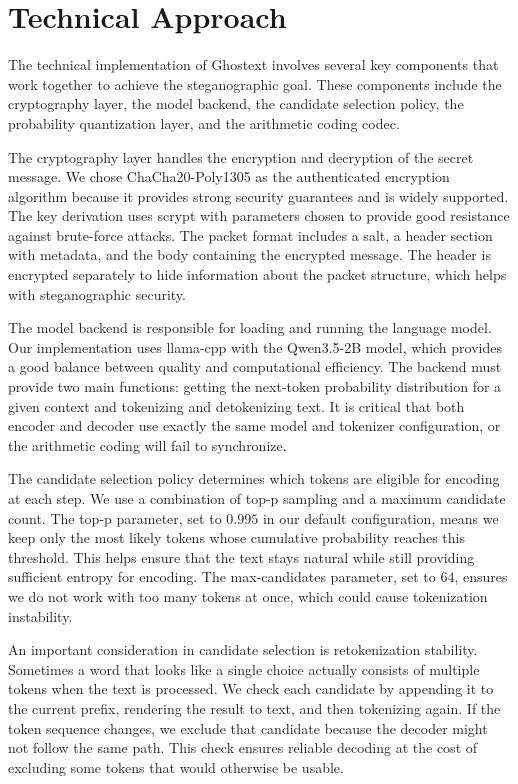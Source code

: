 \documentclass[sigconf,review,anonymous]{acmart}
\begin{document}
{\section{Technical Approach}

The technical implementation of Ghostext involves several key components that work together to achieve the steganographic goal. These components include the cryptography layer, the model backend, the candidate selection policy, the probability quantization layer, and the arithmetic coding codec.

The cryptography layer handles the encryption and decryption of the secret message. We chose ChaCha20-Poly1305 as the authenticated encryption algorithm because it provides strong security guarantees and is widely supported. The key derivation uses scrypt with parameters chosen to provide good resistance against brute-force attacks. The packet format includes a salt, a header section with metadata, and the body containing the encrypted message. The header is encrypted separately to hide information about the packet structure, which helps with steganographic security.

The model backend is responsible for loading and running the language model. Our implementation uses llama-cpp with the Qwen3.5-2B model, which provides a good balance between quality and computational efficiency. The backend must provide two main functions: getting the next-token probability distribution for a given context and tokenizing and detokenizing text. It is critical that both encoder and decoder use exactly the same model and tokenizer configuration, or the arithmetic coding will fail to synchronize.

The candidate selection policy determines which tokens are eligible for encoding at each step. We use a combination of top-p sampling and a maximum candidate count. The top-p parameter, set to $0.995$ in our default configuration, means we keep only the most likely tokens whose cumulative probability reaches this threshold. This helps ensure that the text stays natural while still providing sufficient entropy for encoding. The max-candidates parameter, set to $64$, ensures we do not work with too many tokens at once, which could cause tokenization instability.

An important consideration in candidate selection is retokenization stability. Sometimes a word that looks like a single choice actually consists of multiple tokens when the text is processed. We check each candidate by appending it to the current prefix, rendering the result to text, and then tokenizing again. If the token sequence changes, we exclude that candidate because the decoder might not follow the same path. This check ensures reliable decoding at the cost of excluding some tokens that would otherwise be usable.

}
\end{document}
